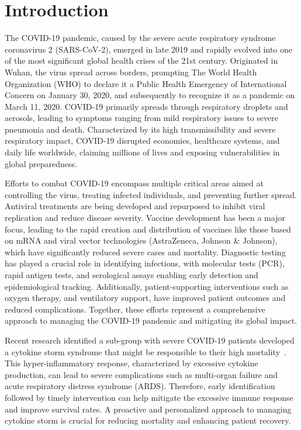 \section{Introduction}
\label{chap:Introduction}

The COVID-19 pandemic, caused by the severe acute respiratory syndrome coronavirus 2 (SARS-CoV-2), emerged in late 2019 and rapidly evolved into one of the most significant global health crises of the 21st century. Originated in Wuhan, the virus spread across borders, prompting The World Health Organization (WHO) to declare it a Public Health Emergency of International Concern on January 30, 2020, and subsequently to recognize it as a pandemic on March 11, 2020. 
COVID-19 primarily spreads through respiratory droplets and aerosols, leading to symptoms ranging from mild respiratory issues to severe pneumonia and death. 
Characterized by its high transmissibility and severe respiratory impact, COVID-19 disrupted economies, healthcare systems, and daily life worldwide, claiming millions of lives and exposing vulnerabilities in global preparedness.

Efforts to combat COVID-19 encompass multiple critical areas aimed at controlling the virus, treating infected individuals, and preventing further spread. Antiviral treatments are being developed and repurposed to inhibit viral replication and reduce disease severity. Vaccine development has been a major focus, leading to the rapid creation and distribution of vaccines like those based on mRNA and viral vector technologies (AstraZeneca, Johnson \& Johnson), which have significantly reduced severe cases and mortality. Diagnostic testing has played a crucial role in identifying infections, with molecular tests (PCR), rapid antigen tests, and serological assays enabling early detection and epidemiological tracking. Additionally, patient-supporting interventions such as oxygen therapy, and ventilatory support, have improved patient outcomes and reduced complications. Together, these efforts represent a comprehensive approach to managing the COVID-19 pandemic and mitigating its global impact.

Recent research identified a sub-group with severe COVID-19 patients developed a cytokine storm syndrome that might be responsible to their high mortality~\cite{mehta2020covid}. This hyper-inflammatory response, characterized by excessive cytokine production, can lead to severe complications such as multi-organ failure and acute respiratory distress syndrome (ARDS). Therefore, early identification followed by timely intervention can help mitigate the excessive immune response and improve survival rates. A proactive and personalized approach to managing cytokine storm is crucial for reducing mortality and enhancing patient recovery.

